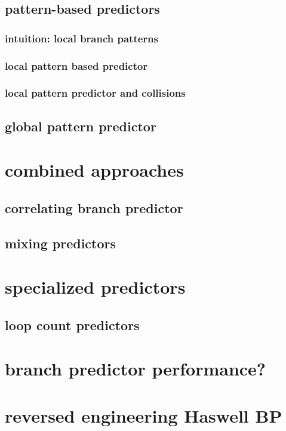 
\subsection{pattern-based predictors}
\subsubsection{intuition: local branch patterns}

\subsubsection{local pattern based predictor}


\subsubsection{local pattern predictor and collisions}


\subsection{global pattern predictor}
 

\section{combined approaches}

\subsection{correlating branch predictor}

\subsection{mixing predictors}


\section{specialized predictors}
\subsection{loop count predictors}


\section{branch predictor performance?}


\section{reversed engineering Haswell BP}

